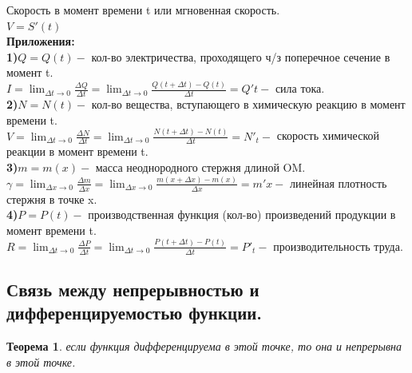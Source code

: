 \documentclass[12pt, a4paper]{article}
\newtheorem{theorem}{Теорема}[subsection]
\theoremstyle{remark}
\begin{document}
	Скорость в момент времени t или мгновенная скорость. \\
	
	$V = S'(t)$ \\
	
	\textbf{Приложения:} \\
	
	\textbf{1)}$Q = Q(t) -$ кол-во электричества, проходящего ч/з поперечное сечение в момент t.\\
	
	\noindent$I = \lim_{\Delta t \to 0} \frac{\Delta Q}{\Delta t} = \lim_{\Delta t \to 0} \frac{Q(t + \Delta t) - Q(t)}{\Delta t} = Q't -$ сила тока. \\
	
	\textbf{2)}$ N = N(t) -$ кол-во вещества, вступающего в химическую реакцию в момент времени t.\\
	
	\noindent$V = \lim_{\Delta t \to 0} \frac{\Delta N}{\Delta t} = \lim_{\Delta t \to 0} \frac{N(t + \Delta t) - N(t)}{\Delta t} = N'_t -$ скорость химической реакции в момент времени t. \\
	
	\textbf{3)}$m = m(x) -$ масса неоднородного стержня длиной OM. \\
	
	\noindent$\gamma = \lim_{\Delta x \to 0} \frac{\Delta m}{\Delta x} = \lim_{\Delta x \to 0} \frac{m(x + \Delta x) - m(x)}{\Delta x} = m'x -$ линейная плотность стержня в точке x. \\
	
	\textbf{4)}$P = P(t) -$ производственная функция (кол-во) произведений продукции в момент времени t. \\
	
	\noindent$R = \lim_{\Delta t \to 0} \frac{\Delta P}{\Delta t} = \lim_{\Delta t \to 0} \frac{P(t + \Delta t) - P(t)}{\Delta t} = P'_t -$ производительность труда. 
	
	\newpage
	
	\subsection{Связь между непрерывностью и дифференцируемостью функции.}
	
	\begin{theorem}
		если функция дифференцируема в этой точке, то она и непрерывна в этой точке.
	\end{theorem}
	
\end{document}
